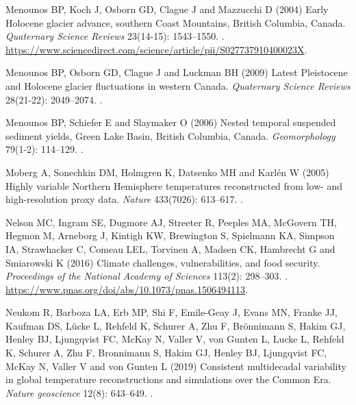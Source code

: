 \documentclass[Royal,times,doublespace,sageh]{sagej}
\begin{document}
\begin{thebibliography}{69}
{
Menounos BP, Koch J, Osborn GD, Clague J and Mazzucchi D (2004) {Early Holocene
  glacier advance, southern Coast Mountains, British Columbia, Canada}.
\newblock \emph{Quaternary Science Reviews} 23(14-15): 1543--1550.
\newblock {}.
\newblock
  \urlprefix\url{https://www.sciencedirect.com/science/article/pii/S027737910400023X}.

Menounos BP, Osborn GD, Clague J and Luckman BH (2009) {Latest Pleistocene and
  Holocene glacier fluctuations in western Canada}.
\newblock \emph{Quaternary Science Reviews} 28(21-22): 2049--2074.
\newblock {}.

Menounos BP, Schiefer E and Slaymaker O (2006) {Nested temporal suspended
  sediment yields, Green Lake Basin, British Columbia, Canada}.
\newblock \emph{Geomorphology} 79(1-2): 114--129.
\newblock {}.

Moberg A, Sonechkin DM, Holmgren K, Datsenko MH and Karl{\'{e}}n W (2005)
  {Highly variable Northern Hemisphere temperatures reconstructed from low- and
  high-resolution proxy data}.
\newblock \emph{Nature} 433(7026): 613--617.
\newblock {}.

Nelson MC, Ingram SE, Dugmore AJ, Streeter R, Peeples MA, McGovern TH, Hegmon
  M, Arneborg J, Kintigh KW, Brewington S, Spielmann KA, Simpson IA,
  Strawhacker C, Comeau LEL, Torvinen A, Madsen CK, Hambrecht G and Smiarowski
  K (2016) {Climate challenges, vulnerabilities, and food security}.
\newblock \emph{Proceedings of the National Academy of Sciences} 113(2):
  298--303.
\newblock {}.
\newblock \urlprefix\url{https://www.pnas.org/doi/abs/10.1073/pnas.1506494113}.

Neukom R, Barboza LA, Erb MP, Shi F, Emile-Geay J, Evans MN, Franke JJ, Kaufman
  DS, L{\"{u}}cke L, Rehfeld K, Schurer A, Zhu F, Br{\"{o}}nnimann S, Hakim GJ,
  Henley BJ, Ljungqvist FC, McKay N, Valler V, von Gunten L, Lucke L, Rehfeld
  K, Schurer A, Zhu F, Bronnimann S, Hakim GJ, Henley BJ, Ljungqvist FC, McKay
  N, Valler V and von Gunten L (2019) {Consistent multidecadal variability in
  global temperature reconstructions and simulations over the Common Era}.
\newblock \emph{Nature geoscience} 12(8): 643--649.
\newblock {}.

}
\end{thebibliography}
\end{document}

